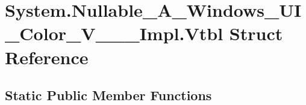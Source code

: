\hypertarget{struct_system_1_1_nullable___a___windows___u_i___color___v_______impl_1_1_vtbl}{}\section{System.\+Nullable\+\_\+\+A\+\_\+\+Windows\+\_\+\+U\+I\+\_\+\+Color\+\_\+\+V\+\_\+\+\_\+\+\_\+\+Impl.\+Vtbl Struct Reference}
\label{struct_system_1_1_nullable___a___windows___u_i___color___v_______impl_1_1_vtbl}
\subsection*{Static Public Member Functions}
